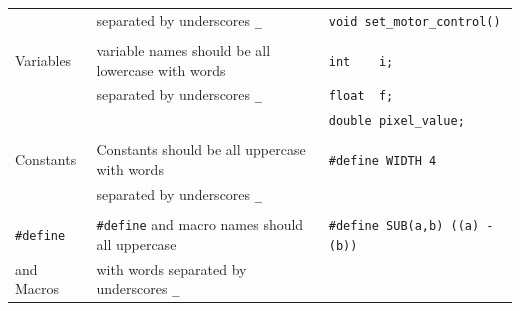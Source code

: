 \documentclass{CSSRforAfrica}
\begin{document}
\begin{appendices}
{\begin{tabular}{l|l l}
                & separated by underscores {\small \verb+_+}         &{\small \verb+void set_motor_control()+} \\ 
                &                                                    &                                         \\ 
Variables       & variable names should be all lowercase with words  &{\small \verb+int    i;+}                \\ 
                & separated by underscores {\small \verb+_+}         &{\small \verb+float  f;+}                \\ 
                & 								               &{\small \verb+double pixel_value;+}      \\ 
                &                                                    &                                         \\ 
Constants       & Constants should be all uppercase with words       &{\small \verb+#define WIDTH 4+}          \\ 
                & separated by underscores {\small \verb+_+}         &                                         \\ 
                &                                                    &                                         \\ 
\verb+#define+  & \verb+#define+ and macro names should all uppercase&\verb+#define SUB(a,b) ((a) - (b))+ \\ 
and Macros      & with words separated by underscores \verb+_+       &                                         \\ 
\end{tabular}
}


\end{appendices}
\end{document}
